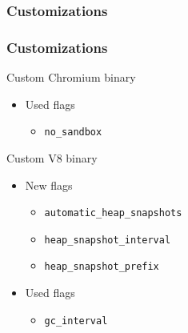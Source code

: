 \documentclass{beamer}
\begin{document}
	\subsubsection{Customizations}
	\begin{frame}
		\frametitle{Customizations}
		Custom Chromium binary
		\begin{itemize}
			\item Used flags
			\begin{itemize}
				\item \texttt{no\_sandbox} 						%
			\end{itemize}
		\end{itemize}
	
		Custom V8 binary
		\begin{itemize}
			\item New flags
			\begin{itemize}
				\item \texttt{automatic\_heap\_snapshots} 		%
				\item \texttt{heap\_snapshot\_interval} 		%
				\item \texttt{heap\_snapshot\_prefix} 			%
			\end{itemize}
			\item Used flags
			\begin{itemize}
				\item \texttt{gc\_interval} 					%
			\end{itemize}
		\end{itemize}
	\end{frame}
\end{document}
